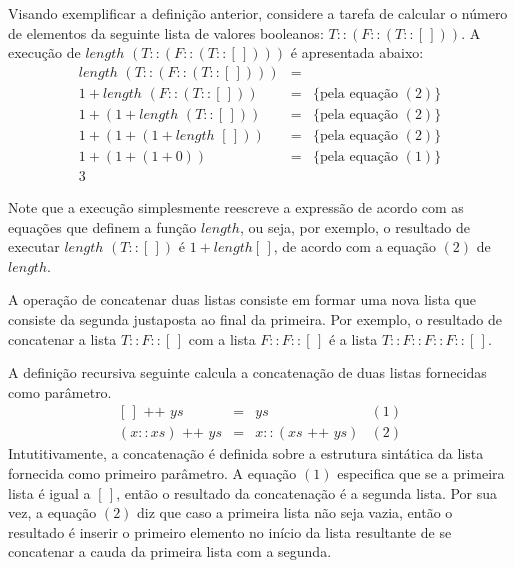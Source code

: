 \begin{Example}
Visando exemplificar a defini\c{c}\~ao anterior, considere a tarefa de calcular o n\'umero de elementos da seguinte lista de valores
booleanos: $T :: (F :: (T :: [\,]))$. A execu\c{c}\~ao de $length\,\,(T :: (F :: (T :: [\,])))$ \'e apresentada abaixo:
\[
\begin{array}{lcl}
length\,\,(T :: (F :: (T :: [\,]))) & = & \\
1 + length\,\,(F :: (T :: [\,]))  & = & \{\text{pela equa\c{c}\~ao }(2)\}\\
1 + (1 + length\,\,(T :: [\,]))  & = & \{\text{pela equa\c{c}\~ao }(2)\}\\
1 + (1 + (1 + length\,\,[\,]))  & = & \{\text{pela equa\c{c}\~ao }(2)\}\\
1 + (1 + (1 + 0))  & = & \{\text{pela equa\c{c}\~ao }(1)\}\\
3                  &   & 
\end{array}
\]
\end{Example}

Note que a execu\c{c}\~ao simplesmente reescreve a express\~ao de acordo com as equa\c{c}\~oes que definem a fun\c{c}\~ao $length$, ou seja, por
exemplo, o resultado de executar $length\,\,(T :: [\,])$  \'e $1 + length [\,]$, de acordo com a equa\c{c}\~ao $(2)$ de $length$.

A opera\c{c}\~ao de concatenar duas listas consiste em formar uma nova lista que consiste da segunda justaposta ao final da primeira. Por exemplo,
o resultado de concatenar a lista $T :: F :: [\,]$ com a lista $F :: F :: [\,]$ \'e a lista $T :: F :: F :: F :: [\,]$.

\begin{Definition}\label{def:concat:lists}
 A defini\c{c}\~ao recursiva seguinte calcula a concatena\c{c}\~ao de duas listas fornecidas como par\^ametro. 
 \[
  \begin{array}{lclr}
    [\,] \text{ ++ } ys & = & ys & (1)\\
    (x :: xs) \text{ ++ } ys & = & x :: (xs \text{ ++ } ys) & (2)
  \end{array}
  \]
Intutitivamente, a concatena\c{c}\~ao \'e definida sobre a estrutura sint\'atica da lista fornecida como primeiro par\^ametro. A equa\c{c}\~ao 
$(1)$ especifica que se a primeira lista \'e igual a $[\,]$, ent\~ao o resultado da concatena\c{c}\~ao \'e a segunda lista. Por sua vez,
a equa\c{c}\~ao $(2)$ diz que caso a primeira lista n\~ao seja vazia, ent\~ao o resultado \'e inserir o primeiro elemento no in\'icio da lista
resultante de se concatenar a cauda da primeira lista com a segunda.
\end{Definition}

